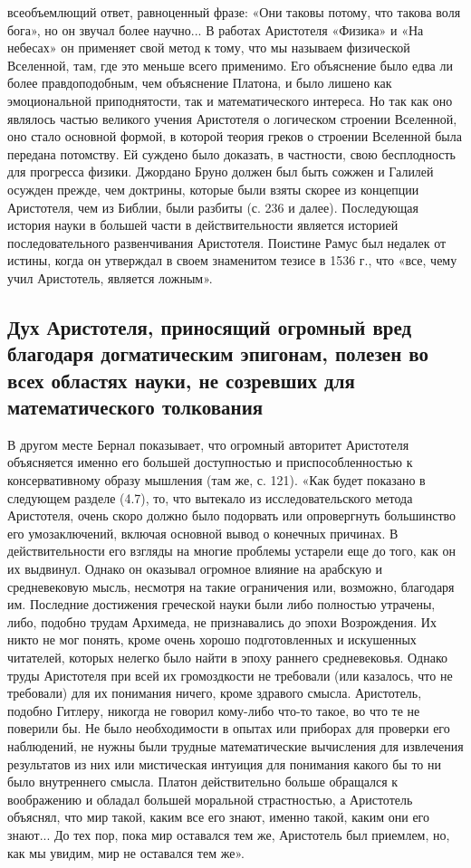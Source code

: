 всеобъемлющий ответ, равноценный фразе: «Они таковы потому, что такова
воля бога», но он звучал более научно... В работах Аристотеля «Физика»
и «На небесах» он применяет свой метод к тому, что мы называем
физической Вселенной, там, где это меньше всего применимо. Его
объяснение было едва ли более правдоподобным, чем объяснение Платона,
и было лишено как эмоциональной приподнятости, так и математического
интереса. Но так как оно являлось частью великого учения Аристотеля о
логическом строении Вселенной, оно стало основной формой, в которой
теория греков о строении Вселенной была передана потомству. Ей суждено
было доказать, в частности, свою бесплодность для прогресса физики.
Джордано Бруно должен был быть сожжен и Галилей осужден прежде, чем
доктрины, которые были взяты скорее из концепции Аристотеля, чем из
Библии, были разбиты (с. 236 и далее). Последующая история науки в
большей части в действительности является историей последовательного
развенчивания Аристотеля. Поистине Рамус был недалек от истины, когда
он утверждал в своем знаменитом тезисе в 1536 г., что «все, чему учил
Аристотель, является ложным».

\subsection{Дух Аристотеля, приносящий огромный вред благодаря
догматическим эпигонам, полезен во всех областях науки, не
созревших для математического толкования}

В другом месте Бернал показывает, что огромный авторитет
Аристотеля объясняется именно его большей доступностью и
приспособленностью к консервативному образу мышления (там же, с. 121).
«Как будет показано в следующем разделе (4.7), то, что вытекало из
исследовательского метода Аристотеля, очень скоро должно было
подорвать или опровергнуть большинство его умозаключений, включая
основной вывод о конечных причинах. В действительности его взгляды на
многие проблемы устарели еще до того, как он их выдвинул. Однако он
оказывал огромное влияние на арабскую и средневековую мысль, несмотря
на такие ограничения или, возможно, благодаря им. Последние достижения
греческой науки были либо полностью утрачены, либо, подобно трудам
Архимеда, не признавались до эпохи Возрождения. Их никто не мог
понять, кроме очень хорошо подготовленных и искушенных читателей,
которых нелегко было найти в эпоху раннего средневековья. Однако труды
Аристотеля при всей их громоздкости не требовали (или казалось, что не
требовали) для их понимания ничего, кроме здравого смысла. Аристотель,
подобно Гитлеру, никогда не говорил кому-либо что-то такое, во что те
не поверили бы. Не было необходимости в опытах или приборах для
проверки его наблюдений, не нужны были трудные математические
вычисления для извлечения результатов из них или мистическая интуиция
для понимания какого бы то ни было внутреннего смысла. Платон
действительно больше обращался к воображению и обладал большей
моральной страстностью, а Аристотель объяснял, что мир такой, каким
все его знают, именно такой, каким они его знают... До тех пор, пока
мир оставался тем же, Аристотель был приемлем, но, как мы увидим, мир
не оставался тем же».


